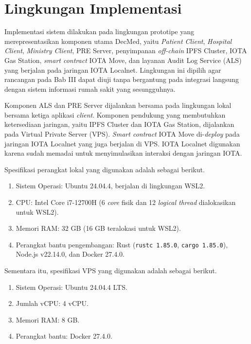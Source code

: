 \section{Lingkungan Implementasi}
\label{sec:lingkungan-implementasi}

Implementasi sistem dilakukan pada lingkungan prototipe yang merepresentasikan
komponen utama DecMed, yaitu \textit{Patient Client}, \textit{Hospital Client},
\textit{Ministry Client}, PRE Server, penyimpanan \textit{off-chain} IPFS
Cluster, IOTA Gas Station, \textit{smart contract} IOTA Move, dan layanan
Audit Log Service (ALS) yang berjalan pada jaringan IOTA Localnet. Lingkungan
ini dipilih agar rancangan pada Bab III dapat diuji tanpa bergantung pada
integrasi langsung dengan sistem informasi rumah sakit yang sesungguhnya.

Komponen ALS dan PRE Server dijalankan bersama pada lingkungan lokal bersama
ketiga aplikasi \textit{client}. Komponen pendukung yang membutuhkan ketersediaan
jaringan, yaitu IPFS Cluster dan IOTA Gas Station, dijalankan pada Virtual
Private Server (VPS). \textit{Smart contract} IOTA Move di-\textit{deploy} pada
jaringan IOTA Localnet yang juga berjalan di VPS. IOTA Localnet digunakan
karena sudah memadai untuk menyimulasikan interaksi dengan jaringan IOTA.

Spesifikasi perangkat lokal yang digunakan adalah sebagai berikut.
\begin{enumerate}
    \item Sistem Operasi: Ubuntu 24.04.4, berjalan di lingkungan WSL2.
    \item CPU: Intel Core i7-12700H (6 \textit{core} fisik dan 12 \textit{logical thread} dialokasikan untuk WSL2).
    \item Memori RAM: 32 GB (16 GB teralokasi untuk WSL2).
    \item Perangkat bantu pengembangan: Rust (\texttt{rustc 1.85.0},
    \texttt{cargo 1.85.0}), Node.js v22.14.0, dan Docker 27.4.0.
\end{enumerate}

Sementara itu, spesifikasi VPS yang digunakan adalah sebagai berikut.
\begin{enumerate}
    \item Sistem Operasi: Ubuntu 24.04.4 LTS.
    \item Jumlah vCPU: 4 vCPU.
    \item Memori RAM: 8 GB.
    \item Perangkat bantu: Docker 27.4.0.
\end{enumerate}

